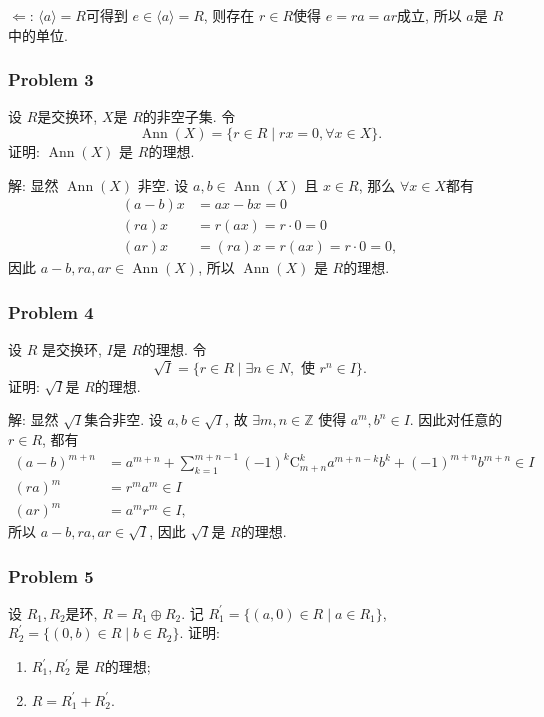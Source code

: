 \documentclass[a4paper,12pt]{ctexart}
\newcommand{\Z}{\mathbb{Z}}
\begin{document}
    $ \Leftarrow $: $ \langle a\rangle=R $可得到 $ e\in\langle a\rangle=R  $, 则存在 $ r\in R $使得 $ e=ra=ar $成立, 
    所以 $ a $是 $ R $中的单位.

\subsubsection*{Problem 3}
    设 $ R $是交换环, $ X $是 $ R $的非空子集. 令
    \[\operatorname{Ann}(X)=\{r\in R\mid rx=0,\forall x\in X\}.\]
    证明: $ \operatorname{Ann}(X) $ 是 $ R $的理想.

    解: 显然 $ \operatorname{Ann}(X) $ 非空. 
    设 $ a,b\in\operatorname{Ann}(X) $ 且 $ x\in R $, 那么 $ \forall x\in X $都有 
      \begin{align*}
        (a-b) x &=a x-b x=0 \\
        (r a) x &=r(a x)=r \cdot 0=0 \\
        (a r) x &=(r a) x=r(a x)=r \cdot 0=0,
      \end{align*}
      因此 $ a-b,ra,ar\in\operatorname{Ann}(X) $, 所以 $ \operatorname{Ann}(X) $ 是 $ R $的理想.

\subsubsection*{Problem 4}
    设 $ R $ 是交换环, $ I $是 $ R $的理想. 令 
    \[\sqrt{I}=\{r\in R\mid \exists n\in N, \text{~使~} r^n\in I \}.\]
    证明: $ \sqrt{I} $是 $ R $的理想.

    解: 显然 $ \sqrt{I} $集合非空. 设 $ a,b\in\sqrt{I} $, 故 $ \exists m,n\in\Z $ 使得 $ a^m,b^n\in I $.
    因此对任意的 $ r\in R $, 都有
    \begin{align*}
      (a-b)^{m+n} &=a^{m+n}+\sum_{k=1}^{m+n-1}(-1)^k \mathrm{C}_{m+n}^k a^{m+n-k} b^k+(-1)^{m+n} b^{m+n} \in I \\
      (r a)^m &=r^m a^m \in I \\
      (a r)^m &=a^m r^m \in I,
    \end{align*}
    所以 $ a-b,ra,ar\in\sqrt{I} $, 因此 $ \sqrt{I} $是 $ R $的理想.

\subsubsection*{Problem 5}
    设 $ R_1,R_2 $是环, $ R=R_1\oplus R_2 $. 记 $ R_1^{\prime}=\{(a,0)\in R\mid a\in R_1\} $, 
    $ R_2^{\prime}=\{(0,b)\in R\mid b\in R_2\} $. 证明:
    \begin{enumerate}[label=(\arabic{*})]
      \item $ R_1^{\prime},R_2^{\prime} $ 是 $ R $的理想;
      \item $ R=R_1^{\prime}+R_2^{\prime} $.
    \end{enumerate}
\end{document}
